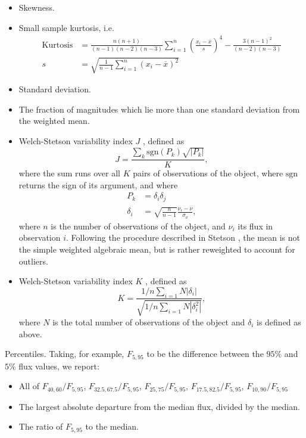 \begin{itemize}
\item{Skewness.}
\item{Small sample kurtosis, i.e.
\begin{align}
\mathrm{Kurtosis} &= \frac{n(n+1)}{(n-1)(n-2)(n-3)} \sum_{i=1}^{n} \left(\frac{x_i - \overline{x}}{s}\right)^4 -\frac{3(n-1)^2}{(n-2)(n-3)} \\
s &= \sqrt{\frac{1}{n-1} \sum_{i=1}^{n}(x_i - \overline{x})^2}
\end{align}
}
\item{Standard deviation.}
\item{The fraction of magnitudes which lie more than one standard deviation from the weighted mean.}
\item{Welch-Stetson variability index $J$ \cite{Stetson96}, defined as
\[
J = \frac{\sum_{k} \mathrm{sgn}(P_k) \sqrt{|P_k|}}{K},
\]
where the sum runs over all $K$ pairs of observations of the object, where $\mathrm{sgn}$ returns the sign of its argument, and where
\begin{align}
P_k &= \delta_i \delta_j \\
\delta_i &= \sqrt{\frac{n}{n-1}}\frac{\nu_i - \overline{\nu}}{\sigma_{\nu}},
\end{align}
where $n$ is the number of observations of the object, and $\nu_i$ its flux in observation $i$. Following the procedure described in Stetson \cite{Stetson96}, the mean is not the simple weighted algebraic mean, but is rather reweighted to account for outliers.}
\item{Welch-Stetson variability index $K$ \cite{Stetson96}, defined as
\[
K = \frac{1/n \sum_{i=1}{N}|\delta_i|}{\sqrt{1/n \sum_{i=1}{N}|\delta_i^2|}},
\]
where $N$ is the total number of observations of the object and $\delta_i$ is defined as above.}
\end{itemize}

Percentiles. Taking, for example, $F_{5,95}$ to be the difference between the $95\%$ and $5\%$ flux values, we report:

\begin{itemize}
\item{All of $F_{40,60} / F_{5,95}$, $F_{32.5,67.5} / F_{5,95}$, $F_{25,75} / F_{5,95}$, $F_{17.5,82.5} / F_{5,95}$, $F_{10,90} / F_{5,95}$}
\item{The largest absolute departure from the median flux, divided by the
median.}
\item{The ratio of $F_{5,95}$ to the median.}
\end{itemize}


